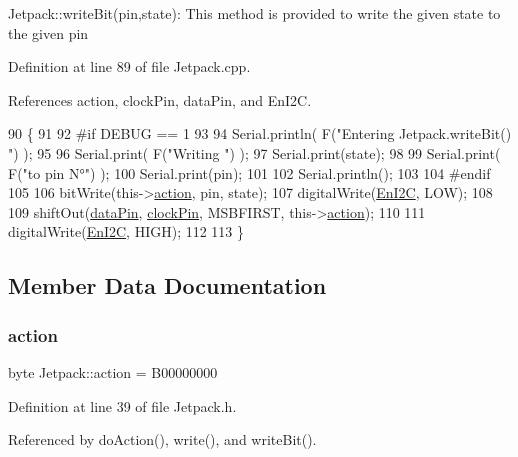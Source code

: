 Jetpack\+::write\+Bit(pin,state)\+: This method is provided to write the given state to the given pin 

Definition at line 89 of file Jetpack.\+cpp.



References action, clock\+Pin, data\+Pin, and En\+I2C.


\begin{DoxyCode}
90 \{
91 
92 \textcolor{preprocessor}{#if DEBUG == 1 }
93 
94     Serial.println( F(\textcolor{stringliteral}{"Entering Jetpack.writeBit() "}) );
95 
96     Serial.print( F(\textcolor{stringliteral}{"Writing "}) );
97     Serial.print(state);
98 
99     Serial.print( F(\textcolor{stringliteral}{"to pin N°"}) );
100     Serial.print(pin);
101 
102     Serial.println();
103 
104 \textcolor{preprocessor}{#endif}
105 
106     bitWrite(this->\hyperlink{classJetpack_aca3142925a7b0834b34ae91d26af7765}{action}, pin, state);
107     digitalWrite(\hyperlink{classJetpack_a81df984fb4cea98c71aa1a1cfcdfe814}{EnI2C}, LOW);
108     
109     shiftOut(\hyperlink{classJetpack_a3d669a56e93c71dd25f970d4ed7d0c00}{dataPin}, \hyperlink{classJetpack_a58ebb991f358f3ae94e82148b0221b5a}{clockPin}, MSBFIRST, this->\hyperlink{classJetpack_aca3142925a7b0834b34ae91d26af7765}{action});
110 
111     digitalWrite(\hyperlink{classJetpack_a81df984fb4cea98c71aa1a1cfcdfe814}{EnI2C}, HIGH);
112 
113 \}
\end{DoxyCode}


\subsection{Member Data Documentation}
\mbox{\label{classJetpack_aca3142925a7b0834b34ae91d26af7765}} 
\subsubsection{\texorpdfstring{action}{action}}
{\footnotesize\ttfamily byte Jetpack\+::action = B00000000\hspace{0.3cm}{\ttfamily [private]}}



Definition at line 39 of file Jetpack.\+h.



Referenced by do\+Action(), write(), and write\+Bit().

\mbox{\label{classJetpack_a7e16d2f97837f9712a2e6de1c50d99db}} 
